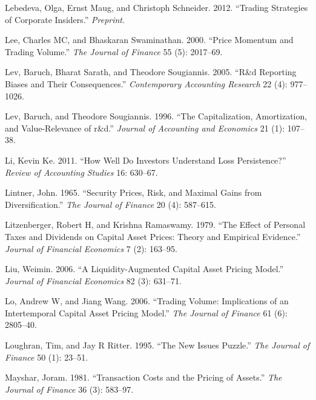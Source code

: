 \documentclass[
  letterpaper,
  DIV=11,
  numbers=noendperiod]{scrreprt}
\newlength{\cslhangindent}
\newlength{\cslentryspacingunit} %
\newenvironment{CSLReferences}[2] %
 {%
  \setlength{\parindent}{0pt}
  \ifodd #1
  \let\oldpar\par
  \def\par{\hangindent=\cslhangindent\oldpar}
  \fi
  \setlength{\parskip}{#2\cslentryspacingunit}
 }%
 {}
\begin{document}
\begin{CSLReferences}{1}{0}
\leavevmode{}%
Lebedeva, Olga, Ernst Maug, and Christoph Schneider. 2012. {``Trading
Strategies of Corporate Insiders.''} \emph{Preprint}.

\leavevmode{}%
Lee, Charles MC, and Bhaskaran Swaminathan. 2000. {``Price Momentum and
Trading Volume.''} \emph{The Journal of Finance} 55 (5): 2017--69.

\leavevmode{}%
Lev, Baruch, Bharat Sarath, and Theodore Sougiannis. 2005. {``R\&d
Reporting Biases and Their Consequences.''} \emph{Contemporary
Accounting Research} 22 (4): 977--1026.

\leavevmode{}%
Lev, Baruch, and Theodore Sougiannis. 1996. {``The Capitalization,
Amortization, and Value-Relevance of r\&d.''} \emph{Journal of
Accounting and Economics} 21 (1): 107--38.

\leavevmode{}%
Li, Kevin Ke. 2011. {``How Well Do Investors Understand Loss
Persistence?''} \emph{Review of Accounting Studies} 16: 630--67.

\leavevmode{}%
Lintner, John. 1965. {``Security Prices, Risk, and Maximal Gains from
Diversification.''} \emph{The Journal of Finance} 20 (4): 587--615.

\leavevmode{}%
Litzenberger, Robert H, and Krishna Ramaswamy. 1979. {``The Effect of
Personal Taxes and Dividends on Capital Asset Prices: Theory and
Empirical Evidence.''} \emph{Journal of Financial Economics} 7 (2):
163--95.

\leavevmode{}%
Liu, Weimin. 2006. {``A Liquidity-Augmented Capital Asset Pricing
Model.''} \emph{Journal of Financial Economics} 82 (3): 631--71.

\leavevmode{}%
Lo, Andrew W, and Jiang Wang. 2006. {``Trading Volume: Implications of
an Intertemporal Capital Asset Pricing Model.''} \emph{The Journal of
Finance} 61 (6): 2805--40.

\leavevmode{}%
Loughran, Tim, and Jay R Ritter. 1995. {``The New Issues Puzzle.''}
\emph{The Journal of Finance} 50 (1): 23--51.

\leavevmode{}%
Mayshar, Joram. 1981. {``Transaction Costs and the Pricing of Assets.''}
\emph{The Journal of Finance} 36 (3): 583--97.


\end{CSLReferences}
\end{document}
